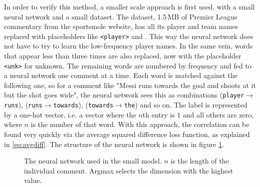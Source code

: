 \documentclass[10pt, a4paper]{UUThesisTemplate}
\begin{document}
In order to verify this method, a smaller scale approach is first used, with a small neural network and a small dataset. The dataset, 1.5\,MB of Premier League commentary from the sportsmole website, has all its player and team names replaced with placeholders like \texttt{<player>} and . This way the neural network does not have to try to learn the low-frequency player names. In the same vein, words that appear less than three times are also replaced, now with the placeholder \texttt{<unk>} for unknown. The remaining words are numbered by frequency and fed to a neural network one comment at a time. Each word is matched against the following one, so for a comment like "Messi runs towards the goal and shoots at it but the shot goes wide", the neural network sees this as combinations (\texttt{player}$\to$\texttt{runs}), (\texttt{runs}$\to$\texttt{towards}), (\texttt{towards}$\to$\texttt{the}) and so on. The label is represented by a one-hot vector, i.e. a vector where the $n$th entry is $1$ and all others are zero, where $n$ is the number of that word. With this approach, the correlation can be found very quickly via the average squared difference loss function, as explained in \eqref{eq:avgdiff}. The structure of the neural network is shown in figure \ref{fig:nnsmallscale}.

\begin{figure}
\caption{The neural network used in the small model. $n$ is the length of the individual comment. Argmax selects the dimension with the highest value.}
\label{fig:nnsmallscale}
\vspace{-0.4cm}
\end{figure}
\end{document}

